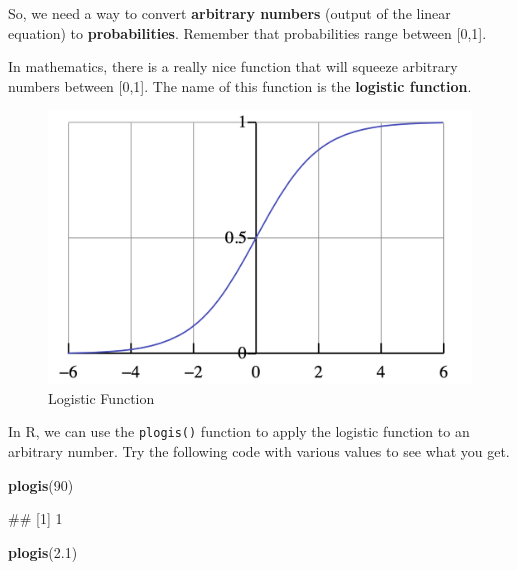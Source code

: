 \documentclass[
]{book}
\newenvironment{Shaded}{\begin{snugshade}}{\end{snugshade}}
\newcommand{\DecValTok}[1]{\textcolor[rgb]{0.00,0.00,0.81}{#1}}
\newcommand{\FloatTok}[1]{\textcolor[rgb]{0.00,0.00,0.81}{#1}}
\newcommand{\FunctionTok}[1]{\textcolor[rgb]{0.13,0.29,0.53}{\textbf{#1}}}
\newcommand{\NormalTok}[1]{#1}
\begin{document}
So, we need a way to convert \textbf{arbitrary numbers} (output of the linear equation) to \textbf{probabilities}. Remember that probabilities range between {[}0,1{]}.

In mathematics, there is a really nice function that will squeeze arbitrary numbers between {[}0,1{]}. The name of this function is the \textbf{logistic function}.

\begin{figure}
\centering
\includegraphics{./img/logis.png}
\caption{\label{fig:unnamed-chunk-291}Logistic Function}
\end{figure}

In R, we can use the \texttt{plogis()} function to apply the logistic function to an arbitrary number. Try the following code with various values to see what you get.

\begin{Shaded}
\begin{Highlighting}[]
\FunctionTok{plogis}\NormalTok{(}\DecValTok{90}\NormalTok{)}
\end{Highlighting}
\end{Shaded}

\begin{Shaded}
\begin{Highlighting}[]
\NormalTok{\#\# [1] 1}
\end{Highlighting}
\end{Shaded}

\begin{Shaded}
\begin{Highlighting}[]
\FunctionTok{plogis}\NormalTok{(}\FloatTok{2.1}\NormalTok{)}
\end{Highlighting}
\end{Shaded}
\end{document}
